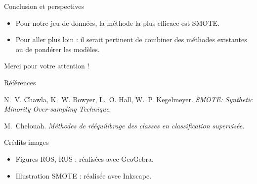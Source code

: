 \documentclass{beamer}
\begin{document}
\begin{frame}{Conclusion et perspectives}
    \begin{itemize}
        \item Pour notre jeu de données, la méthode la plus efficace est SMOTE.\\[0.5cm]
        \item  Pour aller plus loin : il serait pertinent de combiner des méthodes existantes ou de pondérer les modèles.
    \end{itemize}
\end{frame}

\begin{frame}
    \centering
    \Huge Merci pour votre attention !
\end{frame}

\begin{frame}[allowframebreaks]{Références}
    \small
    \begin{thebibliography}{9}

    N.~V. Chawla, K.~W. Bowyer, L.~O. Hall, W.~P. Kegelmeyer.
    \newblock \emph{SMOTE: Synthetic Minority Over-sampling Technique}.

    M.~Chelouah.
    \newblock \emph{Méthodes de rééquilibrage des classes en classification supervisée}.

    \end{thebibliography}
    \end{frame}

    \begin{frame}{Crédits images}
      \small
      \begin{itemize}
        \item Figures ROS, RUS : réalisées avec GeoGebra.
        \item Illustration SMOTE : réalisée avec Inkscape.
      \end{itemize}
    \end{frame}
\end{document}
